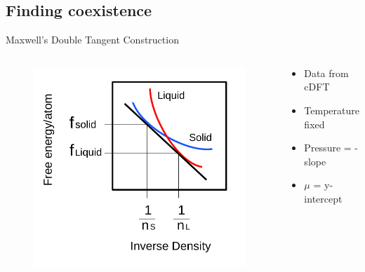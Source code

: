 \documentclass{beamer}
\begin{document}
\subsection*{Finding coexistence}
\begin{frame}{Maxwell's Double Tangent Construction}
	\begin{columns}[t]
        \begin{figure}
            \centering
            \includegraphics[width=\columnwidth]{figs/MaxwellDTC-Fig1.pdf}
          \end{figure}
		\begin{block}{}
			\begin{itemize}
				\item Data from cDFT 
				\item Temperature fixed
				\item Pressure = -slope
				\item $\mu$ = y-intercept
			\end{itemize}
	    \end{block}
	\end{columns}	
\end{frame}
\end{document}
